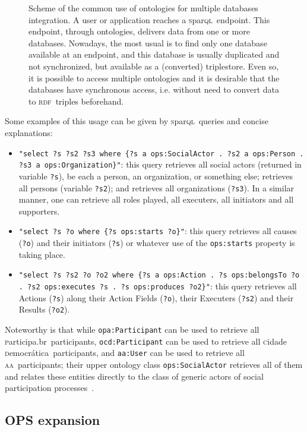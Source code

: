 \documentclass[10pt,letterpaper]{article}
\newcommand{\sparql}{\textsc{s}par\textsc{ql}}
\newcommand{\rdf}{\textsc{rdf}}
\newcommand{\aan}{\textsc{aa}}
\newcommand{\cidadedemocratica}{\textsc{c}idade \textsc{d}emocr\'atica}
\newcommand{\participa}{\textsc{p}articipa.br}
\begin{document}
\begin{figure}[!h]
    \centering
    \caption{Scheme of the common use of ontologies for multiple databases integration. A user or application reaches a \sparql\ endpoint. This endpoint, through ontologies, delivers data from one or more databases. Nowadays, the most usual is to find only one database available at an endpoint, and this database is usually duplicated and not synchronized, but available as a (converted) triplestore. Even so, it is possible to access multiple ontologies and it is desirable that the databases have synchronous access, i.e. without need to convert data to \rdf\ triples beforehand.}
    \label{endpoint}
\end{figure}

Some examples of this usage can be given by \sparql\ queries and concise explanations:
\begin{itemize}
    \item \texttt{"select ?s ?s2 ?s3 where \{?s a ops:SocialActor . ?s2 a ops:Person . ?s3 a ops:Organization\}"}: this query retrieves all social actors (returned in variable \texttt{?s}), be each a person, an organization, or something else; retrieves all persons (variable \texttt{?s2}); and retrieves all organizations (\texttt{?s3}). In a similar manner, one can retrieve all roles played, all executers, all initiators and all supporters.
    \item \texttt{"select ?s ?o where \{?s ops:starts ?o\}"}: this query retrieves all causes ({\tt ?o}) and their initiators ({\tt ?s}) or whatever use of the {\tt ops:starts} property is taking place.
    \item \texttt{"select ?s ?s2 ?o ?o2 where \{?s a ops:Action . ?s ops:belongsTo ?o . ?s2 ops:executes ?s . ?s ops:produces ?o2\}"}: this query retrieves all Actions (\texttt{?s}) along their Action Fields (\texttt{?o}), their Executers (\texttt{?s2}) and their Results (\texttt{?o2}).
\end{itemize}

Noteworthy is that while {\tt opa:Participant} can be used to retrieve all \participa\ participants, {\tt ocd:Participant} can be used to retrieve all \cidadedemocratica\ participants, and {\tt aa:User} can be used to retrieve all \aan\ participants; their upper ontology class {\tt ops:SocialActor} retrieves all of them and relates these entities directly to the class of generic actors of social participation processes~\cite{pnud5}.

\subsection{OPS expansion}\label{downwards}
\end{document}
